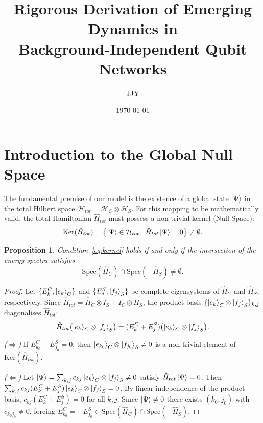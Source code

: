\documentclass[11pt,a4paper]{article}
\title{Rigorous Derivation of Emerging Dynamics in \\ Background-Independent Qubit Networks}
\author{JJY}
\date{\today}
\newtheorem{proposition}[theorem]{Proposition}
\theoremstyle{definition}
\theoremstyle{remark}
\begin{document}
\maketitle

\section{Introduction to the Global Null Space}

The fundamental premise of our model is the existence of a global state $\ket{\Psi}$ in the
total Hilbert space $\mathcal{H}_{tot} = \mathcal{H}_C \otimes \mathcal{H}_S$.
For this mapping to be mathematically valid, the total Hamiltonian $\hat{H}_{tot}$ must possess
a non-trivial kernel (Null Space):
\begin{equation}\label{eq:kernel}
    \mathrm{Ker}(\hat{H}_{tot})
      = \bigl\{\ket{\Psi}\in\mathcal{H}_{tot}\mid\hat{H}_{tot}\ket{\Psi}=0\bigr\}
      \neq \emptyset.
\end{equation}

\begin{proposition}\label{prop:kernel}
Condition~\eqref{eq:kernel} holds \emph{if and only if} the intersection of the energy spectra
satisfies
\begin{equation}\label{eq:spec}
    \mathrm{Spec}(\hat{H}_C)\cap\mathrm{Spec}(-\hat{H}_S)\neq\emptyset.
\end{equation}
\end{proposition}

\begin{proof}
Let $\{E_k^C,\ket{e_k}_C\}$ and $\{E_j^S,\ket{f_j}_S\}$ be complete eigensystems of
$\hat{H}_C$ and $\hat{H}_S$, respectively.
Since $\hat{H}_{tot}=\hat{H}_C\otimes I_S + I_C\otimes\hat{H}_S$, the product basis
$\{\ket{e_k}_C\otimes\ket{f_j}_S\}_{k,j}$ diagonalises $\hat{H}_{tot}$:
\[
  \hat{H}_{tot}\bigl(\ket{e_k}_C\otimes\ket{f_j}_S\bigr)
    = (E_k^C+E_j^S)\bigl(\ket{e_k}_C\otimes\ket{f_j}_S\bigr).
\]

\noindent\textit{($\Rightarrow$)}\enspace
If $E_{k_0}^C+E_{j_0}^S=0$, then $\ket{e_{k_0}}_C\otimes\ket{f_{j_0}}_S\neq 0$
is a non-trivial element of $\mathrm{Ker}(\hat{H}_{tot})$.

\noindent\textit{($\Leftarrow$)}\enspace
Let $\ket{\Psi}=\sum_{k,j}c_{kj}\ket{e_k}_C\otimes\ket{f_j}_S\neq 0$ satisfy
$\hat{H}_{tot}\ket{\Psi}=0$.  Then
$\sum_{k,j}c_{kj}(E_k^C+E_j^S)\ket{e_k}_C\otimes\ket{f_j}_S = 0$.
By linear independence of the product basis, $c_{kj}(E_k^C+E_j^S)=0$ for all $k,j$.
Since $\ket{\Psi}\neq 0$ there exists $(k_0,j_0)$ with $c_{k_0j_0}\neq 0$,
forcing $E_{k_0}^C=-E_{j_0}^S\in\mathrm{Spec}(\hat{H}_C)\cap\mathrm{Spec}(-\hat{H}_S)$.
\end{proof}
\end{document}
